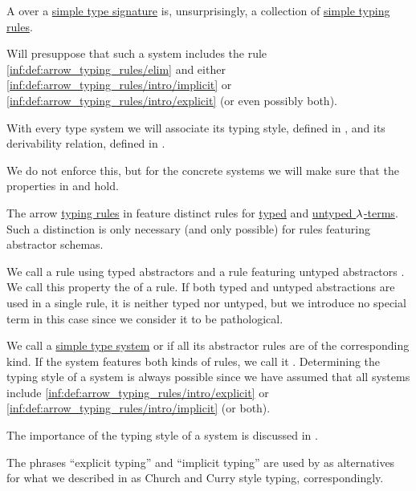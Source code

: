 \begin{definition}\label{def:simple_type_system}\mimprovised
  A  over a \hyperref[def:simple_type_signature]{simple type signature} is, unsurprisingly, a collection of \hyperref[def:simple_typing_rule]{simple typing rules}.

  Will presuppose that such a system includes the rule \ref{inf:def:arrow_typing_rules/elim} and either \ref{inf:def:arrow_typing_rules/intro/implicit} or \ref{inf:def:arrow_typing_rules/intro/explicit} (or even possibly both).
\end{definition}
\begin{comments}
  \item With every type system we will associate its typing style, defined in , and its derivability relation, defined in .

  \item We do not enforce this, but for the concrete systems we will make sure that the properties in  and  hold.
\end{comments}

\begin{definition}\label{def:simple_type_system_style}\mimprovised
  The arrow \hyperref[def:simple_typing_rule]{typing rules} in  feature distinct rules for \hyperref[def:typed_lambda_term]{typed} and \hyperref[def:lambda_term]{untyped \( \mathrm{\lambda} \)-terms}. Such a distinction is only necessary (and only possible) for rules featuring abstractor schemas.

  We call a rule using typed abstractors  and a rule featuring untyped abstractors . We call this property the  of a rule. If both typed and untyped abstractions are used in a single rule, it is neither typed nor untyped, but we introduce no special term in this case since we consider it to be pathological.

  We call a \hyperref[def:simple_type_system]{simple type system}  or  if all its abstractor rules are of the corresponding kind. If the system features both kinds of rules, we call it . Determining the typing style of a system is always possible since we have assumed that all systems include \ref{inf:def:arrow_typing_rules/intro/explicit} or \ref{inf:def:arrow_typing_rules/intro/implicit} (or both).
\end{definition}
\begin{comments}
  \item The importance of the typing style of a system is discussed in .

  \item The phrases \enquote{explicit typing} and \enquote{implicit typing} are used by  as alternatives for what we described in  as Church and Curry style typing, correspondingly.
\end{comments}

